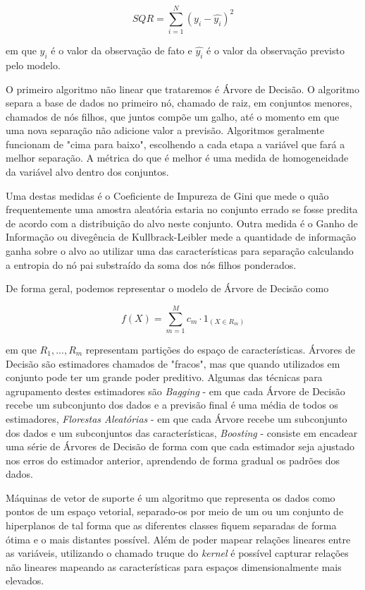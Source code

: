 \documentclass[twocolumn]{rbef}
\newcommand{\1}{\mathbbm{1}}
\begin{document}
\begin{equation}
    SQR = \sum_{i=1}^{N} (y_{i} - \hat{y_{i}})^{2}
\end{equation}

em que $y_{i}$ é o valor da observação de fato e $\hat{y_{i}}$ é o valor da observação previsto pelo modelo.

O primeiro algoritmo não linear que trataremos é Árvore de Decisão. O algoritmo separa a base de dados no primeiro nó, chamado de raiz, em conjuntos menores, chamados de nós filhos, que juntos compõe um galho, até o momento em que uma nova separação não adicione valor a previsão. Algoritmos geralmente funcionam de "cima para baixo", escolhendo a cada etapa a variável que fará a melhor separação. A métrica do que é melhor é uma medida de homogeneidade da variável alvo dentro dos conjuntos.

Uma destas medidas é o Coeficiente de Impureza de Gini que mede o quão frequentemente uma amostra aleatória estaria no conjunto errado se fosse predita de acordo com a distribuição do alvo neste conjunto. Outra medida é o Ganho de Informação ou divegência de Kullbrack-Leibler\cite{Kullbrack} mede a quantidade de informação ganha sobre o alvo ao utilizar uma das características para separação calculando a entropia do nó pai substraído da soma dos nós filhos ponderados.

De forma geral, podemos representar o modelo de Árvore de Decisão como\cite{James}

\begin{equation}
    f(X) = \sum_{m=1}^{M} c_{m} \cdot 1_{(X \in R_{m})}
\end{equation}

em que $R_{1}, ..., R_{m}$ representam partições do espaço de características. Árvores de Decisão são estimadores chamados de "fracos", mas que quando utilizados em conjunto pode ter um grande poder preditivo. Algumas das técnicas para agrupamento destes estimadores são \textit{Bagging}\cite{BreimanBag} - em que cada Árvore de Decisão recebe um subconjunto dos dados e a previsão final é uma média de todos os estimadores, \textit{Florestas Aleatórias}\cite{BreimanRF} - em que cada Árvore recebe um subconjunto dos dados e um subconjuntos das características, \textit{Boosting}\cite{BreimanB} - consiste em encadear uma série de Árvores de Decisão de forma com que cada estimador seja ajustado nos erros do estimador anterior, aprendendo de forma gradual os padrões dos dados.

Máquinas de vetor de suporte é um algoritmo que representa os dados como pontos de um espaço vetorial, separado-os por meio de um ou um conjunto de hiperplanos de tal forma que as diferentes classes fiquem separadas de forma ótima e o mais distantes possível\cite{Cortes}. Além de poder mapear relações lineares entre as variáveis, utilizando o chamado truque do \textit{kernel} é possível capturar relações não lineares mapeando as características para espaços dimensionalmente mais elevados.
\end{document}
